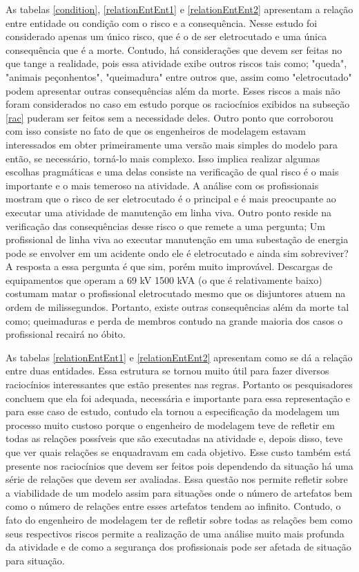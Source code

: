 As tabelas \ref{condition}, \ref{relationEntEnt1} e \ref{relationEntEnt2} apresentam a relação entre entidade ou condição com o risco e a consequência. Nesse estudo foi considerado apenas um único risco, que é o de ser eletrocutado e uma única consequência que é a morte. Contudo, há considerações que devem ser feitas no que tange a realidade, pois essa atividade exibe outros riscos tais como; "queda", "animais peçonhentos", "queimadura" entre outros que, assim como "eletrocutado" podem apresentar outras consequências além da morte. Esses riscos a mais não foram considerados no caso em estudo porque os raciocínios exibidos na subseção \ref{rac} puderam ser feitos sem a necessidade deles. Outro ponto que corroborou com isso consiste no fato de que os engenheiros de modelagem estavam interessados em obter primeiramente uma versão mais simples do modelo para então, se necessário, torná-lo mais complexo. Isso implica realizar algumas escolhas pragmáticas e uma delas consiste na verificação de qual risco é o mais importante e o mais temeroso na atividade. A análise com os profissionais mostram que o risco de 
ser eletrocutado é o principal e é mais preocupante ao executar uma atividade de manutenção em linha viva. Outro ponto reside na verificação das consequências desse risco o que remete a uma pergunta; Um profissional de linha viva ao executar manutenção em uma subestação de energia pode se envolver em um acidente ondo ele é eletrocutado e ainda sim sobreviver? A resposta a essa pergunta é que sim, porém muito improvável. Descargas de equipamentos que operam a 69 kV 1500 kVA  (o que é relativamente baixo) costumam matar o profissional eletrocutado mesmo que 
os disjuntores atuem na ordem de milissegundos. Portanto, existe outras consequências além da morte tal como; queimaduras e perda de membros contudo na grande maioria dos casos o profissional recairá no óbito. 

As tabelas \ref{relationEntEnt1} e \ref{relationEntEnt2} apresentam como se dá a relação entre duas entidades. Essa estrutura se tornou muito útil para fazer diversos raciocínios interessantes que estão presentes nas regras. Portanto os pesquisadores concluem que ela foi adequada, necessária e importante para essa representação e para esse caso de estudo, contudo ela tornou a especificação da modelagem um processo muito custoso porque o engenheiro de modelagem teve de refletir em todas as relações possíveis que são executadas na atividade e, depois disso, teve 
que ver quais relações se enquadravam em cada objetivo. Esse custo também está presente nos raciocínios que devem ser feitos pois dependendo da situação há uma série de relações que devem ser avaliadas. Essa questão nos permite refletir sobre a viabilidade de um modelo assim para situações onde o número de artefatos bem como o número de relações entre esses artefatos tendem ao infinito. Contudo, o fato do engenheiro de modelagem ter de refletir sobre todas as relações bem como seus respectivos riscos permite a realização de uma análise muito mais profunda 
da atividade e de como a segurança dos profissionais pode ser afetada de situação para situação. 

